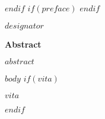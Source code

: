 \documentclass[12pt,letterpaper,toc=flat,oneside]{book}
\begin{document}
 \def\ackhead{\chapter*{Acknowledgements}
  \addcontentsline{toc}{chapter}{Acknowledgements}
  \addtocontents{toc}{\protect\addvspace{10\p@}}
 }
 \def\acktail{\par \null\vspace*{.75in}\hspace*{3in} \@author \newpage} 
$endif$
$if(preface)$
\newenvironment{preface}{
\chapter*{Preface}     
\addcontentsline{toc}{chapter}{Preface}
\addtocontents{toc}{\protect\addvspace{10\p@}}
}{}
$endif$
    \thispagestyle{plain}
    \noindent $designator$
    \begin{center}
	\large\bfseries Abstract
    \end{center}
    \vspace{2em}
    $abstract$
\renewcommand\contentsname{\hfill \bfseries\large Table of Contents\hfill}
\tableofcontents
\newpage
\renewcommand\listtablename{\hfill \bfseries\large List of Tables\hfill}
\listoftables
\newpage
\renewcommand\listfigurename{\hfill \bfseries\large List of Figures\hfill}
\listoffigures
\newpage
$body$
$if(vita)$
    \begin{center}
	\bfseries $vita$
    \end{center}
    \vspace{2em}
    \newpage
$endif$
 
\end{document}
